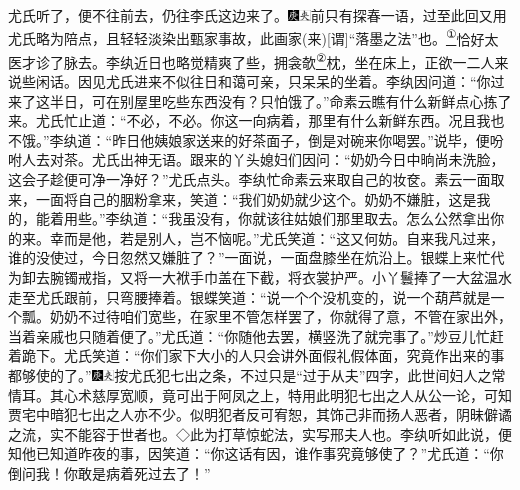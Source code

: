 尤氏听了，便不往前去，仍往李氏这边来了。{\includegraphics[width=3mm]{../Images/00004}\includegraphics[width=3mm]{../Images/00012}\footnotesize \kaishu 前只有探春一语，过至此回又用尤氏略为陪点，且轻轻淡染出甄家事故，此画家{(来)}{[}谓{]}``落墨之法''也。}\href{../Text/part0079_split_000.html\#lnkback_1_a}{\textsuperscript{①}}恰好太医才诊了脉去。李纨近日也略觉精爽了些，拥衾欹\href{../Text/part0079_split_000.html\#lnkback_2_a}{\textsuperscript{②}}枕，坐在床上，正欲一二人来说些闲话。因见尤氏进来不似往日和蔼可亲，只呆呆的坐着。李纨因问道：``你过来了这半日，可在别屋里吃些东西没有？只怕饿了。''命素云瞧有什么新鲜点心拣了来。尤氏忙止道：``不必，不必。你这一向病着，那里有什么新鲜东西。况且我也不饿。''李纨道：``昨日他姨娘家送来的好茶面子，倒是对碗来你喝罢。''说毕，便吩咐人去对茶。尤氏出神无语。跟来的丫头媳妇们因问：``奶奶今日中晌尚未洗脸，这会子趁便可净一净好？''尤氏点头。李纨忙命素云来取自己的妆奁。素云一面取来，一面将自己的胭粉拿来，笑道：``我们奶奶就少这个。奶奶不嫌脏，这是我的，能着用些。''李纨道：``我虽没有，你就该往姑娘们那里取去。怎么公然拿出你的来。幸而是他，若是别人，岂不恼呢。''尤氏笑道：``这又何妨。自来我凡过来，谁的没使过，今日忽然又嫌脏了？''一面说，一面盘膝坐在炕沿上。银蝶上来忙代为卸去腕镯戒指，又将一大袱手巾盖在下截，将衣裳护严。小丫鬟捧了一大盆温水走至尤氏跟前，只弯腰捧着。银蝶笑道：``说一个个没机变的，说一个葫芦就是一个瓢。奶奶不过待咱们宽些，在家里不管怎样罢了，你就得了意，不管在家出外，当着亲戚也只随着便了。''尤氏道：``你随他去罢，横竖洗了就完事了。''炒豆儿忙赶着跪下。尤氏笑道：``你们家下大小的人只会讲外面假礼假体面，究竟作出来的事都够使的了。''{\includegraphics[width=3mm]{../Images/00004}\includegraphics[width=3mm]{../Images/00012}\footnotesize \kaishu 按尤氏犯七出之条，不过只是``过于从夫''四字，此世间妇人之常情耳。其心术慈厚宽顺，竟可出于阿凤之上，特用此明犯七出之人从公一论，可知贾宅中暗犯七出之人亦不少。似明犯者反可宥恕，其饰己非而扬人恶者，阴昧僻谲之流，实不能容于世者也。◇此为打草惊蛇法，实写邢夫人也。}李纨听如此说，便知他已知道昨夜的事，因笑道：``你这话有因，谁作事究竟够使了？''尤氏道：``你倒问我！你敢是病着死过去了！''

